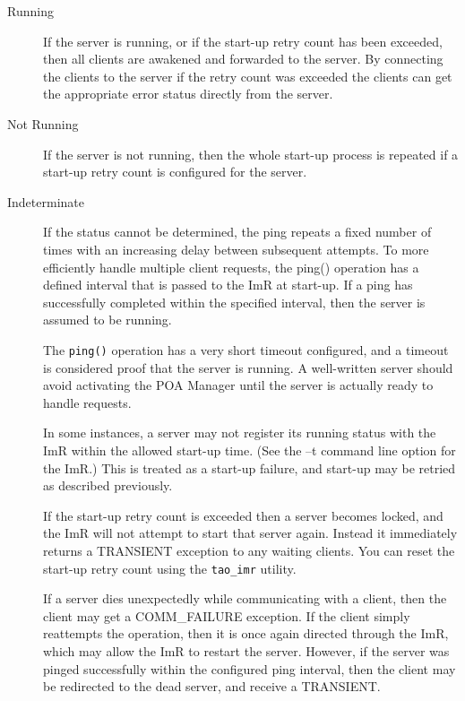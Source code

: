 \begin{description}
      \item [Running]
                If the server is running, or if the start-up retry count has been exceeded,
                then all clients are awakened and forwarded to the server. By connecting
              the clients to the server if the retry count was exceeded the clients can get
              the appropriate error status directly from the server.
     \item [Not Running]
               If the server is not running, then the whole start-up process is repeated
               if a start-up retry count is configured for the server.
     \item [Indeterminate]
               If the status cannot be determined, the ping repeats a fixed number of
               times with an increasing delay between subsequent attempts.  To more
               efficiently handle multiple client requests, the ping() operation has a
               defined interval that is passed to the ImR at start-up. If a ping has
               successfully completed within the specified interval, then the server is
               assumed to be running.

               The {\tt ping()} operation has a very short timeout configured, and a timeout
               is considered proof that the server is running. A well-written server should
               avoid activating the POA Manager until the server is actually ready to handle
               requests.

               In some instances, a server may not register its running status with the ImR
               within the allowed start-up time. (See the –t command line option for the ImR.)
               This is treated as a start-up failure, and start-up may be retried as described
               previously.

               If the start-up retry count is exceeded then a server becomes locked, and the
               ImR will not attempt to start that server again. Instead it immediately returns
               a TRANSIENT exception to any waiting clients. You can reset the start-up
               retry count using the {\tt tao\_imr} utility.

               If a server dies unexpectedly while communicating with a client, then the client
               may get a COMM_FAILURE exception. If the client simply reattempts the
               operation, then it is once again directed through the ImR, which may allow the
               ImR to restart the server. However, if the server was pinged successfully within
               the configured ping interval, then the client may be redirected to the dead server,
               and receive a TRANSIENT.
\end{description}

